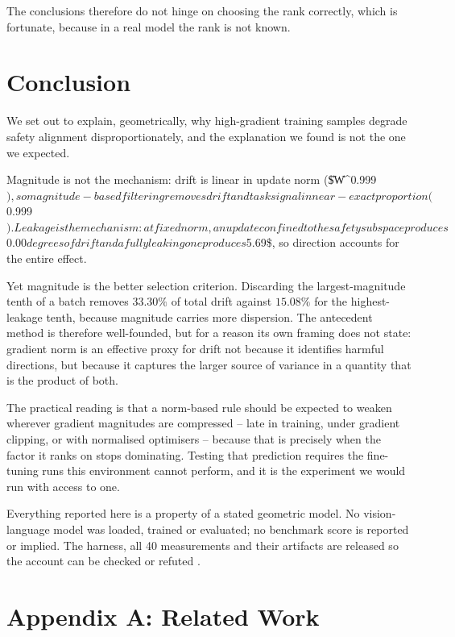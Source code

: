\documentclass[10pt,twocolumn,letterpaper]{article}
\begin{document}
The conclusions therefore do not hinge on choosing the rank correctly, which is fortunate, because in a real model the rank is not known.




\section{Conclusion}


We set out to explain, geometrically, why high-gradient training samples degrade safety alignment disproportionately, and the explanation we found is not the one we expected.

Magnitude is not the mechanism: drift is linear in update norm (\$\|\Delta W\|^{0.999}$), so magnitude-based filtering removes drift and task signal in near-exact proportion ($0.999\times$). Leakage is the mechanism: at fixed norm, an update confined to the safety subspace produces $0.00$ degrees of drift and a fully leaking one produces $5.69\$, so direction accounts for the entire effect.

Yet magnitude is the better selection criterion. Discarding the largest-magnitude tenth of a batch removes $33.30\%$ of total drift against $15.08\%$ for the highest-leakage tenth, because magnitude carries more dispersion. The antecedent method is therefore well-founded, but for a reason its own framing does not state: gradient norm is an effective proxy for drift not because it identifies harmful directions, but because it captures the larger source of variance in a quantity that is the product of both.

The practical reading is that a norm-based rule should be expected to weaken wherever gradient magnitudes are compressed -- late in training, under gradient clipping, or with normalised optimisers -- because that is precisely when the factor it ranks on stops dominating. Testing that prediction requires the fine-tuning runs this environment cannot perform, and it is the experiment we would run with access to one.

Everything reported here is a property of a stated geometric model. No vision-language model was loaded, trained or evaluated; no benchmark score is reported or implied. The harness, all 40 measurements and their artifacts are released so the account can be checked or refuted \cite{arxiv_2604_17215}.




\section{Appendix A: Related Work}
\end{document}
